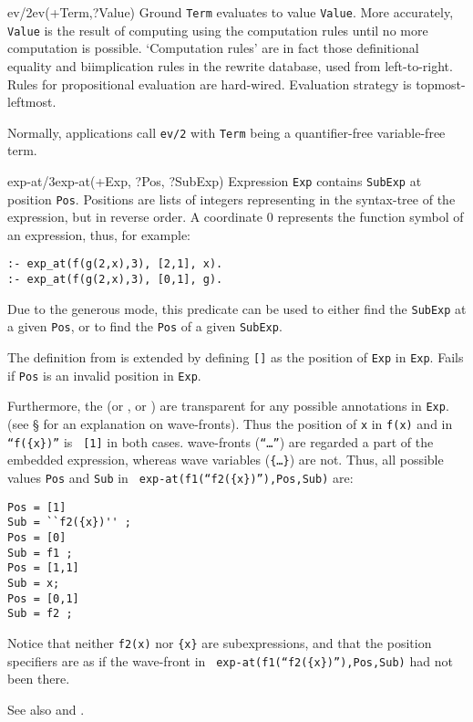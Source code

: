 \begin{predicate}{ev/2}{ev(+Term,?Value)}%
Ground {\tt Term} evaluates to value {\tt Value}.  More accurately,
{\tt Value} is the result of computing using the computation rules
until no more computation is possible.  `Computation rules' are in
fact those definitional equality and biimplication rules in the
rewrite database, used from left-to-right.  Rules for propositional
evaluation are hard-wired.  Evaluation strategy is topmost-leftmost.

Normally, applications call {\tt ev/2} with {\tt Term} being a
quantifier-free variable-free term.  
\end{predicate}


\begin{predicate}{exp-at/3}{exp-at(+Exp, ?Pos, ?SubExp)}%
Expression {\tt Exp} contains {\tt SubExp} at position {\tt Pos}.
Positions are lists of integers representing  in
the syntax-tree of the expression, but in reverse order. A coordinate
0 represents the function symbol of an expression, thus, for example:
\begin{verbatim}
:- exp_at(f(g(2,x),3), [2,1], x).
:- exp_at(f(g(2,x),3), [0,1], g).
\end{verbatim}
Due to the generous mode, this predicate can be used to either find
the {\tt SubExp} at a given {\tt Pos}, or to find the {\tt Pos} of a
given {\tt SubExp}.

The definition from \cite{pub349} is extended by defining {\tt []} as
the position of {\tt Exp} in {\tt Exp}. Fails if {\tt Pos} is an
invalid position in {\tt Exp}.

Furthermore, the  (or , or ) are transparent for any
possible  annotations in {\tt Exp}. (see \S{} for an explanation on wave-fronts). Thus the
position of {\tt x} in {\tt f(x)} and in {\tt ``f(\{x\})''} is {\tt
[1]} in both cases. wave-fronts ({\tt ``\ldots''}) are regarded a part
of the embedded expression, whereas wave variables ({\tt \{\ldots\}})
are not. Thus, all possible values {\tt Pos} and {\tt Sub} in {\tt
exp-at(f1(``f2(\{x\})''),Pos,Sub)} are:
\begin{verbatim}
Pos = [1]
Sub = ``f2({x})'' ;
Pos = [0]
Sub = f1 ;
Pos = [1,1]
Sub = x;
Pos = [0,1]
Sub = f2 ;
\end{verbatim}
Notice that neither {\tt f2({x})} nor {\tt \{x\}} are subexpressions,
and that the position specifiers are as if the wave-front in {\tt
exp-at(f1(``f2(\{x\})''),Pos,Sub)} had not been there.

See also  and .
\end{predicate}

